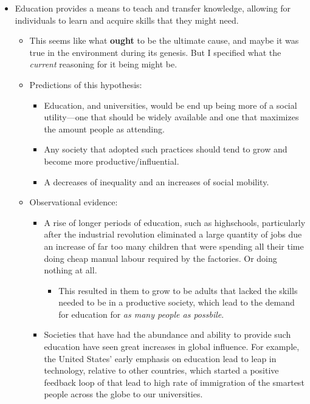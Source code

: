 \documentclass[12pt,a4paper]{article}
\begin{document}
\begin{itemize}
    \item Education provides a means to teach and transfer knowledge, allowing for individuals to learn and acquire skills that they might need.
        \begin{itemize}
            \item This seems like what \textbf{ought} to be the ultimate cause, and maybe it was true in the environment during its genesis. But I specified what the \textit{current} reasoning for it being might be.
            \item Predictions of this hypothesis:
                \begin{itemize}
                    \item Education, and universities, would be end up being more of a social utility---one that should be widely available and one that maximizes the amount people as attending. 
                    \item Any society that adopted such practices should tend to grow and become more productive/influential.
                    \item A decreases of inequality and an increases of social mobility.
                \end{itemize}
            \item Observational evidence:
                \begin{itemize}
                    \item A rise of longer periods of education, such as highschools, particularly after the industrial revolution eliminated a large quantity of jobs due an increase of far too many children that were spending all their time doing cheap manual labour required by the factories. Or doing nothing at all. 
                        \begin{itemize}
                            \item This resulted in them to grow to be adults that lacked the skills needed to be in a productive society, which lead to the demand for education for \textit{as many people as possbile}.
                        \end{itemize}
                    \item Societies that have had the abundance and ability to provide such education have seen great increases in global influence. For example, the United States' early emphasis on education lead to leap in technology, relative to other countries, which started a positive feedback loop of that lead to high rate of immigration of the smartest people across the globe to our universities.

\end{itemize}
\end{itemize}
\end{itemize}
\end{document}
